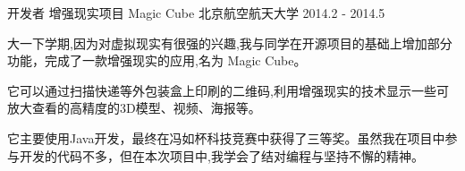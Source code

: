 \begin{cventries}
\cventry
{开发者} %
{增强现实项目 Magic Cube} %
{北京航空航天大学} %
{2014.2 - 2014.5 } %
{ %
	\begin{cvitems}
		\item {大一下学期,因为对虚拟现实有很强的兴趣,我与同学在开源项目的基础上增加部分功能，完成了一款增强现实的应用,名为 Magic Cube。}
		\item {它可以通过扫描快递等外包装盒上印刷的二维码,利用增强现实的技术显示一些可放大查看的高精度的3D模型、视频、海报等。}
		\item {它主要使用Java开发，最终在冯如杯科技竞赛中获得了三等奖。虽然我在项目中参与开发的代码不多，但在本次项目中,我学会了结对编程与坚持不懈的精神。}
	\end{cvitems}
}



\end{cventries}